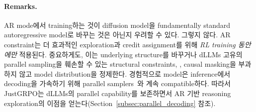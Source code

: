 \paragraph{Remarks.}
AR mode에서 training하는 것이 diffusion model을 fundamentally standard autoregressive model로 바꾸는 것은 아닌지 우려할 수 있다. 
그렇지 않다. AR constraint는 더 효과적인 exploration과 credit assignment를 위해 \emph{RL training 동안에만} 적용된다.
중요하게도, 이는 underlying structure를 바꾸거나 dLLMs 고유의 parallel sampling을 훼손할 수 있는 structural constraints, \eg, causal masking을 부과하지 않고 model distribution을 정제한다.
경험적으로 model은 inference에서 decoding을 가속하기 위해 parallel samplers~\cite{ben2025accelerated}와 계속 compatible하다. 따라서 JustGRPO는 dLLMs의 parallel capability를 보존하면서 AR 기반 reasoning exploration의 이점을 얻는다(Section~\ref{subsec:parallel_decoding} 참조).

